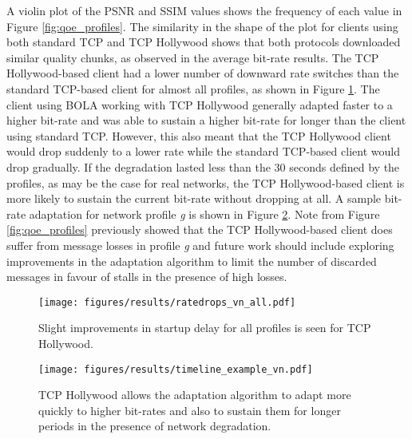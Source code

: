 A violin plot of the PSNR and SSIM values shows the frequency of each value in Figure 
\ref{fig:qoe_profiles}. The similarity in the shape of the plot for clients using both 
standard TCP and TCP Hollywood shows that both protocols downloaded similar quality chunks, 
as observed in the average bit-rate results. The TCP Hollywood-based client had 
a lower number of downward rate switches than the standard TCP-based client for almost all 
profiles, as shown in Figure \ref{fig:ratechange_profiles}. The client using BOLA working
with TCP Hollywood generally adapted faster to a higher bit-rate and was able to sustain a
higher bit-rate for longer than the client using standard TCP. However, this also meant that 
the TCP Hollywood client would drop suddenly to a lower rate while the standard TCP-based 
client would drop
gradually. If the degradation lasted less than the 30 seconds defined by the profiles, as
may be the case for real networks, the TCP Hollywood-based client is more likely to sustain 
the current bit-rate without dropping at all. A sample bit-rate adaptation for network profile 
\emph{g} is shown in Figure \ref{fig:adaptation_profile}. Note from Figure \ref{fig:qoe_profiles}
previously showed that the TCP Hollywood-based client does suffer from message losses in profile 
\emph{g} and future work should include exploring improvements in the adaptation algorithm to 
limit the number of discarded messages in favour of stalls in the presence of high losses. 


\begin{figure}
  \centering
  \texttt{[image: figures/results/ratedrops\_vn\_all.pdf]}
  \caption{Slight improvements in startup delay for all profiles is seen for TCP Hollywood. }
  \label{fig:ratechange_profiles}
\end{figure}

\begin{figure}
  \centering
  \texttt{[image: figures/results/timeline\_example\_vn.pdf]}
  \caption{TCP Hollywood allows the adaptation algorithm to adapt more quickly to higher bit-rates and also to sustain them for longer periods in the presence of network degradation. }
  \label{fig:adaptation_profile}
\end{figure}
